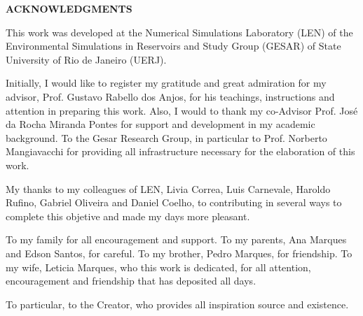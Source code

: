 \begin{center}
\textbf{ACKNOWLEDGMENTS}
\end{center}
$\!$\\

\medskip 
This work was developed at the Numerical Simulations Laboratory (LEN) of the Environmental Simulations in Reservoirs and Study Group (GESAR) of State University of Rio de Janeiro (UERJ).

\medskip 
Initially, I would like to register my gratitude and great admiration for my advisor, Prof. Gustavo Rabello dos Anjos, for his teachings, instructions and attention in preparing this work.
Also, I would to thank my co-Advisor Prof. José da Rocha Miranda Pontes for support and development in my academic background.
To the Gesar Research Group, in particular to Prof. Norberto Mangiavacchi for providing all infrastructure necessary for the elaboration of this work.

\medskip 
My thanks to my colleagues of LEN, Livia Correa, Luis Carnevale, Haroldo Rufino, Gabriel Oliveira and Daniel Coelho, to contributing in several ways to complete this objetive and made my days more pleasant.

\medskip 
To my family for all encouragement and support. To my parents, Ana Marques and Edson Santos, for careful. To my brother, Pedro Marques, for friendship. To my wife, Leticia Marques, who this work is dedicated, for all attention, encouragement and friendship that has deposited all days.

\medskip 
To particular, to the Creator, who provides all inspiration source and existence.
